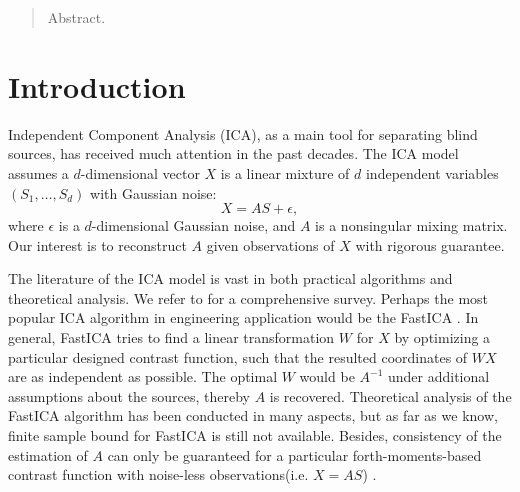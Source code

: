 \documentclass[twoside]{article}
\theoremstyle{definition}
\begin{document}
%

%


\begin{abstract}
Abstract.
\end{abstract}

\section{Introduction}
\label{sec:Intro}
Independent Component Analysis (ICA), as a main tool for separating blind sources, has received much attention in the past decades. 
The ICA model assumes a $d$-dimensional vector $X$ is a linear mixture of $d$ independent variables $(S_1,\ldots, S_d)$ with Gaussian noise:
\[
X = AS+\epsilon,
\]
where $\epsilon$ is a $d$-dimensional Gaussian noise, and $A$ is a nonsingular mixing matrix.
Our interest is to reconstruct $A$ given observations of $X$ with rigorous guarantee.

The literature of the ICA model is vast in both practical algorithms and theoretical analysis. 
We refer to \citep{comon2010handbook} for a comprehensive survey.
Perhaps the most popular ICA algorithm in engineering application would be the FastICA \citep{hyvarinen1999fast}. 
In general, FastICA tries to find a linear transformation $W$ for $X$ by optimizing a particular designed contrast function, 
such that the resulted coordinates of $WX$ are as independent as possible. 
The optimal $W$ would be $A^{-1}$ under additional assumptions about the sources, thereby $A$ is recovered.  
Theoretical analysis of the FastICA algorithm has been conducted in many aspects, 
but as far as we know, finite sample bound for FastICA is still not available.
Besides, consistency of the estimation of $A$ can only be guaranteed for a particular forth-moments-based contrast function with noise-less observations(i.e. $X = AS$) \citep{miettinen2014fourth}. 
\end{document}
